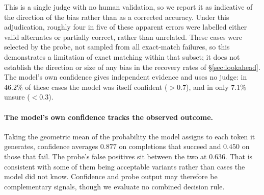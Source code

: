 This is a single judge with no human validation, so we report it as indicative
of the direction of the bias rather than as a corrected accuracy. Under this
adjudication, roughly four in five of these apparent errors were labelled
either valid alternates or partially correct, rather than unrelated. These
cases were selected by the probe, not sampled from all exact-match failures, so
this demonstrates a limitation of exact matching within that subset; it does
not establish the direction or size of any bias in the recovery rates of
\S\ref{sec:lookahead}. The model's own confidence gives independent evidence
and uses no judge: in $46.2\%$ of these cases the model was itself confident
($>0.7$), and in only $7.1\%$ unsure ($<0.3$).

\paragraph{The model's own confidence tracks the observed outcome.}
Taking the geometric mean of the probability the model assigns to each token it
generates, confidence averages $0.877$ on completions that succeed and $0.450$
on those that fail. The probe's false positives sit between the two at $0.636$. That is consistent
with some of them being acceptable variants rather than cases the model did not
know.
Confidence and probe output may therefore be complementary signals, though we
evaluate no combined decision rule.
